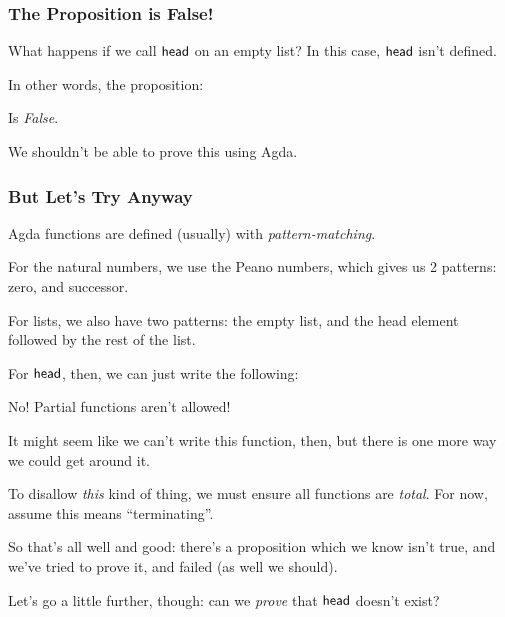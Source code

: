 \documentclass[draft,usenames,dvipsnames]{beamer}
\begin{document}
\begin{frame}
  \frametitle{The Proposition is False!}
  What happens if we call \(\AgdaFunction{head}\) on an empty list? In this
  case, \(\AgdaFunction{head}\) isn't defined.

  In other words, the proposition:


  Is \emph{False}.

  We shouldn't be able to prove this using Agda.
\end{frame}
\begin{frame}[allowframebreaks]
  \frametitle{But Let's Try Anyway}
  Agda functions are defined (usually) with \emph{pattern-matching}. 


  For the natural numbers, we use the Peano numbers, which gives us 2 patterns:
  zero, and successor.

  \framebreak

  For lists, we also have two patterns: the empty list, and the head element
  followed by the rest of the list.


  \framebreak

  For \(\AgdaFunction{head}\), then, we can just write the following:


  \begin{block}{\alert{No!}}
    Partial functions aren't allowed!
  \end{block}

  \framebreak

  It might seem like we can't write this function, then, but there is one more
  way we could get around it.


  To disallow \emph{this} kind of thing, we must ensure all functions are
  \emph{total}. For now, assume this means ``terminating''.
\end{frame}
\begin{frame}
  So that's all well and good: there's a proposition which we know isn't true,
  and we've tried to prove it, and failed (as well we should).

  Let's go a little further, though: can we \emph{prove} that
  \(\AgdaFunction{head}\) doesn't exist?
\end{frame}
\end{document}
